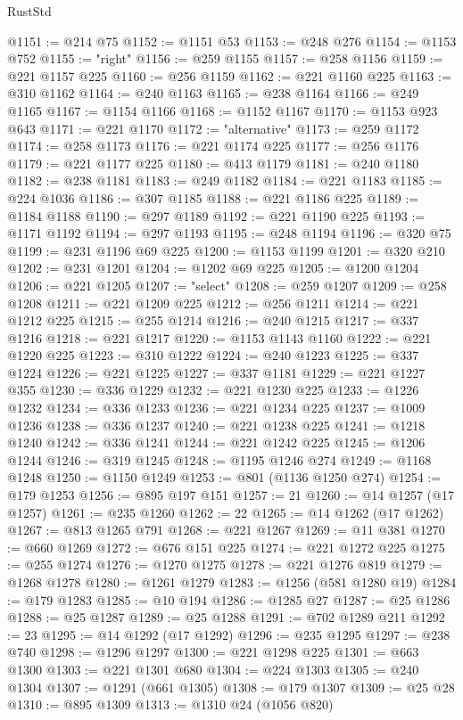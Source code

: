\begin{lexlean}{RustStd}
\begin{coremodule}
@1151 := @214 @75
@1152 := @1151 @53
@1153 := @248 @276
@1154 := @1153 @752
@1155 := "right"
@1156 := @259 @1155
@1157 := @258 @1156
@1159 := @221 @1157 @225
@1160 := @256 @1159
@1162 := @221 @1160 @225
@1163 := @310 @1162
@1164 := @240 @1163
@1165 := @238 @1164
@1166 := @249 @1165
@1167 := @1154 @1166
@1168 := @1152 @1167
@1170 := @1153 @923 @643
@1171 := @221 @1170
@1172 := "alternative"
@1173 := @259 @1172
@1174 := @258 @1173
@1176 := @221 @1174 @225
@1177 := @256 @1176
@1179 := @221 @1177 @225
@1180 := @413 @1179
@1181 := @240 @1180
@1182 := @238 @1181
@1183 := @249 @1182
@1184 := @221 @1183
@1185 := @224 @1036
@1186 := @307 @1185
@1188 := @221 @1186 @225
@1189 := @1184 @1188
@1190 := @297 @1189
@1192 := @221 @1190 @225
@1193 := @1171 @1192
@1194 := @297 @1193
@1195 := @248 @1194
@1196 := @320 @75
@1199 := @231 @1196 @69 @225
@1200 := @1153 @1199
@1201 := @320 @210
@1202 := @231 @1201
@1204 := @1202 @69 @225
@1205 := @1200 @1204
@1206 := @221 @1205
@1207 := "select"
@1208 := @259 @1207
@1209 := @258 @1208
@1211 := @221 @1209 @225
@1212 := @256 @1211
@1214 := @221 @1212 @225
@1215 := @255 @1214
@1216 := @240 @1215
@1217 := @337 @1216
@1218 := @221 @1217
@1220 := @1153 @1143 @1160
@1222 := @221 @1220 @225
@1223 := @310 @1222
@1224 := @240 @1223
@1225 := @337 @1224
@1226 := @221 @1225
@1227 := @337 @1181
@1229 := @221 @1227 @355
@1230 := @336 @1229
@1232 := @221 @1230 @225
@1233 := @1226 @1232
@1234 := @336 @1233
@1236 := @221 @1234 @225
@1237 := @1009 @1236
@1238 := @336 @1237
@1240 := @221 @1238 @225
@1241 := @1218 @1240
@1242 := @336 @1241
@1244 := @221 @1242 @225
@1245 := @1206 @1244
@1246 := @319 @1245
@1248 := @1195 @1246 @274
@1249 := @1168 @1248
@1250 := @1150 @1249
@1253 := @801 (@1136 @1250 @274)
@1254 := @179 @1253
@1256 := @895 @197 @151
@1257 := 21
@1260 := @14 @1257 (@17 @1257)
@1261 := @235 @1260
@1262 := 22
@1265 := @14 @1262 (@17 @1262)
@1267 := @813 @1265 @791
@1268 := @221 @1267
@1269 := @11 @381
@1270 := @660 @1269
@1272 := @676 @151 @225
@1274 := @221 @1272 @225
@1275 := @255 @1274
@1276 := @1270 @1275
@1278 := @221 @1276 @819
@1279 := @1268 @1278
@1280 := @1261 @1279
@1283 := @1256 (@581 @1280 @19)
@1284 := @179 @1283
@1285 := @10 @194
@1286 := @1285 @27
@1287 := @25 @1286
@1288 := @25 @1287
@1289 := @25 @1288
@1291 := @702 @1289 @211
@1292 := 23
@1295 := @14 @1292 (@17 @1292)
@1296 := @235 @1295
@1297 := @238 @740
@1298 := @1296 @1297
@1300 := @221 @1298 @225
@1301 := @663 @1300
@1303 := @221 @1301 @680
@1304 := @224 @1303
@1305 := @240 @1304
@1307 := @1291 (@661 @1305)
@1308 := @179 @1307
@1309 := @25 @28
@1310 := @895 @1309
@1313 := @1310 @24 (@1056 @820)

\end{coremodule}
\end{lexlean}
